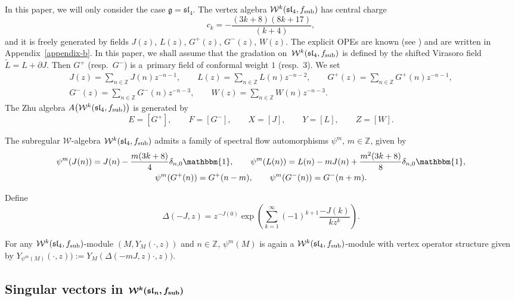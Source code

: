 \documentclass[11pt]{article}
\numberwithin{equation}{section}
\newcommand{\Z}{\mathbb Z}
\begin{document}
In this paper, we will only consider the case $\mathfrak g = \mathfrak{sl}_4$. The vertex algebra $\mathcal{W}^{k}(\mathfrak{sl}_4, f_{\rm sub})$ has central charge
\[
c_k = -\frac{(3k+8)(8k+17)}{(k+4) },
\]
 and it is freely generated by fields $J(z)$, $L(z)$, $G^+ (z)$, $G^- (z)$, $W(z)$. The explicit OPEs are known (see \cite{CL18,FS}) and are written in Appendix~\ref{appendix-b}. In this paper, we shall assume that the gradation on~$\mathcal{W}^{k}(\mathfrak{sl}_4, f_{\rm sub})$ is defined by the shifted Virasoro field $\widetilde L = L + \partial J$. Then $G^+$ (resp.~$G^-$) is a~primary field of conformal weight $1$ (resp.~$3$). We set
\begin{gather*}
J(z) = \sum _{n \in {\Z}} J(n) z^{-n-1}, \qquad L(z) = \sum _{n \in {\Z}} L(n) z^{-n-2}, \qquad G^+ (z) = \sum _{n \in {\Z}} G^+(n) z^{-n-1}, \\ G^- (z) = \sum _{n \in {\Z}} G^-(n) z^{-n-3}, \qquad W (z) = \sum _{n \in {\Z}} W(n) z^{-n-3}.
\end{gather*}	
The Zhu algebra $A\bigl(\mathcal{W}^{k}(\mathfrak{sl}_4, f_{\rm sub})\bigr)$ is generated by
\[
 E=[G^+],\qquad F=[G^- ], \qquad X=[J ], \qquad Y =[L], \qquad Z=[W].
 \]

The subregular $\mathcal{W}$-algebra $\mathcal{W}^k(\mathfrak{sl}_4, f_{\rm sub})$ admits a family of spectral flow automorphisms $\psi^m$, $m \in \mathbb{Z}$, given by
\begin{gather*}
 \psi^m (J(n)) = J(n)- { \frac{m (3 k +8)}{4} }
	 \delta _{n,0}\mathbbm{1} , \qquad \psi^m ( L(n)) = L(n) - mJ(n) + \frac{m^2 { (3k+8)}}{{8} }\delta _{n,0}\mathbbm{1}, \\
 \psi^m (G^+(n)) = G^+(n-m), \qquad \psi^m (G^-(n)) = G^-(n+m).
 \end{gather*}

Define
 \[
 \Delta (-J,z) = z^{-J(0)}\exp \left ( \sum _{k=1} ^{\infty} (-1)^{k+1}\frac{-J(k)}{kz^k}\right ).
 \]

For any $\mathcal{W}^k(\mathfrak{sl}_4, f_{\rm sub})$-module $(M, Y_M(\cdot, z))$ and $n \in \mathbb{Z}$,
$\psi^m (M)$ is again a $\mathcal{W}^k(\mathfrak{sl}_4, f_{\rm sub})$-module with vertex operator structure given by
$ Y_{\psi^m (M) } ( \cdot , z)) := Y_{ M } (\Delta ( -m J, z) \cdot , z))$.

\subsection[Singular vectors in W\^{}k(sl\_n, f\_sub)]{Singular vectors in $\boldsymbol{\mathcal{W}^k(\mathfrak{sl}_n, f_{\rm sub})}$}
	
\end{document}
